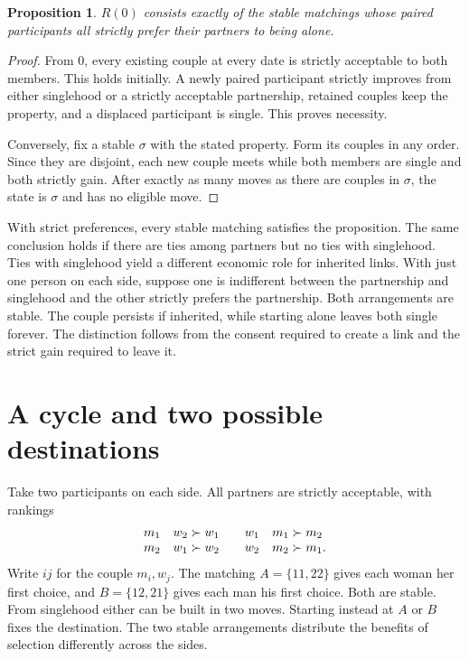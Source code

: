 \documentclass[11pt]{article}
\newtheorem{proposition}{Proposition}
\begin{document}
\begin{proposition}
\(R(0)\) consists exactly of the stable matchings whose paired participants all strictly prefer their partners to being alone.
\end{proposition}

\begin{proof}
From \(0\), every existing couple at every date is strictly acceptable to both members. This holds initially. A newly paired participant strictly improves from either singlehood or a strictly acceptable partnership, retained couples keep the property, and a displaced participant is single. This proves necessity.

Conversely, fix a stable \(\sigma\) with the stated property. Form its couples in any order. Since they are disjoint, each new couple meets while both members are single and both strictly gain. After exactly as many moves as there are couples in \(\sigma\), the state is \(\sigma\) and has no eligible move.
\end{proof}

With strict preferences, every stable matching satisfies the proposition. The same conclusion holds if there are ties among partners but no ties with singlehood. Ties with singlehood yield a different economic role for inherited links. With just one person on each side, suppose one is indifferent between the partnership and singlehood and the other strictly prefers the partnership. Both arrangements are stable. The couple persists if inherited, while starting alone leaves both single forever. The distinction follows from the consent required to create a link and the strict gain required to leave it.

\section{A cycle and two possible destinations}

Take two participants on each side. All partners are strictly acceptable, with rankings
\[
\begin{array}{c@{\quad}l@{\qquad}c@{\quad}l}
 m_1 & w_2\succ w_1 & w_1 & m_1\succ m_2\\
 m_2 & w_1\succ w_2 & w_2 & m_2\succ m_1 .
\end{array}
\]
Write \(ij\) for the couple \(m_i,w_j\). The matching \(A=\{11,22\}\) gives each woman her first choice, and \(B=\{12,21\}\) gives each man his first choice. Both are stable. From singlehood either can be built in two moves. Starting instead at \(A\) or \(B\) fixes the destination. The two stable arrangements distribute the benefits of selection differently across the sides.
\end{document}
